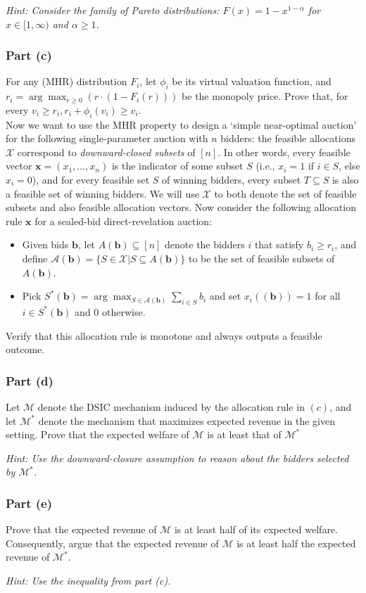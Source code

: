 \documentclass[letterpaper,11pt]{article}
\begin{document}
\noindent\emph{Hint: Consider the family of Pareto distributions: $F(x) = 1- x^{1-\alpha}$ for $x\in[1,\infty)$ and $\alpha\geq 1$.}

\subsubsection*{Part (c)} 
For any (MHR) distribution $F_i$, let $\phi_i$ be its virtual valuation function, and $r_i=\arg\max_{r\geq 0}\left(r\cdot(1 - F_i(r))\right)$ be the monopoly price. Prove that, for every $v_i\geq r_i, r_i + \phi_i(v_i)\geq v_i$.\\

\noindent Now we want to use the MHR property to design a `simple near-optimal auction' for the following single-parameter auction with $n$ bidders: the feasible allocations $\mathcal{X}$ correspond to \emph{downward-closed subsets} of $[n]$. In other words, every feasible vector $\mathbf{x}=(x_1,\ldots, x_n)$ is the indicator of some subset $S$ (i.e., $x_i=1$ if $i\in S$, else $x_i=0$), and for every feasible set $S$ of winning bidders, every subset $T\subseteq S$ is also a feasible set of winning bidders. We will use $\mathcal{X}$ to both denote the set of feasible subsets and also feasible allocation vectors.
Now consider the following allocation rule $\mathbf{x}$ for a sealed-bid direct-revelation auction:
\begin{itemize}[nosep]
\item Given bids $\mathbf{b}$, let $A(\mathbf{b})\subseteq [n]$ denote the bidders $i$ that satisfy $b_i \geq r_i$, and define $\mathcal{A}(\mathbf{b}) = \{S\in\mathcal{X}|S\subseteq A(\mathbf{b})\}$ to be the set of feasible subsets of $A(\mathbf{b})$.
\item Pick $S^*(\mathbf{b}) = \arg\max_{S\in\mathcal{A}(\mathbf{b})} \sum_{i\in S}b_i$ and set $x_i((\mathbf{b}))=1$ for all $i\in S^*(\mathbf{b})$ and $0$ otherwise. 
\end{itemize}
Verify that this allocation rule is monotone and always outputs a feasible outcome. 

\subsubsection*{Part (d)} 
Let $\mathcal{M}$ denote the DSIC mechanism induced by the allocation rule in $(c)$, and let $\mathcal{M}^*$ denote the mechanism that maximizes expected revenue in the given setting. Prove that the expected welfare of $\mathcal{M}$ is at least that of $\mathcal{M}^*$

\noindent\emph{Hint: Use the downward-closure assumption to reason about the bidders selected by $\mathcal{M}^*$.}

\subsubsection*{Part (e)} 
Prove that the expected revenue of $\mathcal{M}$ is at least half of its expected welfare. Consequently, argue that the expected revenue of $\mathcal{M}$ is at least half the expected revenue of $\mathcal{M}^*$.

\noindent\emph{Hint:  Use the inequality from part (c).}
\end{document}
